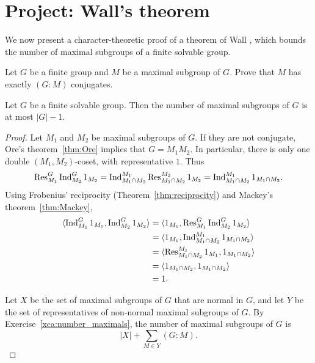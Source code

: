 \section{Project: Wall's theorem}

We now present a character-theoretic proof of a theorem of Wall \cite{MR125156}, 
which bounds the number of maximal subgroups of a finite solvable group. 

\begin{exercise}
    \label{xca:number_maximals}
    Let $G$ be a finite group and $M$ be a maximal subgroup of $G$.
    Prove that $M$ has exactly $(G:M)$ conjugates. 
\end{exercise}

\begin{theorem}[Wall]
\label{thm:Wall}
Let $G$ be a finite solvable group. Then the number of maximal subgroups of $G$ is at most $|G|-1$. 
\end{theorem}

\begin{proof}
    Let $M_1$ and $M_2$ be maximal subgroups of $G$. If they are not conjugate, 
    Ore's theorem~\ref{thm:Ore} implies that $G=M_1M_2$. In particular, 
    there is only one double $(M_1,M_2)$-coset, with representative $1$. Thus
    \[
    \operatorname{Res}_{M_1}^G\operatorname{Ind}_{M_2}^G1_{M_2}=\operatorname{Ind}_{M_1\cap M_2}^{M_1}\operatorname{Res}_{M_1\cap M_2}^{M_2}1_{M_2}
    =\operatorname{Ind}_{M_1\cap M_2}^{M_1}1_{M_1\cap M_2}.
    \]
    Using Frobenius' reciprocity (Theorem~\ref{thm:reciprocity}) and 
    Mackey's theorem~\ref{thm:Mackey}, 
    \begin{align*}
    \langle\operatorname{Ind}_{M_1}^G1_{M_1},\operatorname{Ind}_{M_2}^G1_{M_2}\rangle
    &=\langle 1_{M_1},\operatorname{Res}_{M_1}^G\operatorname{Ind}_{M_2}^G1_{M_2}\rangle\\
    &=\langle 1_{M_1},\operatorname{Ind}_{M_1\cap M_2}^{M_1}1_{M_1\cap M_2}\rangle\\
    &=\langle \operatorname{Res}_{M_1\cap M_2}^{M_1}1_{M_1},1_{M_1\cap M_2}\rangle\\
    &=\langle 1_{M_1\cap M_2},1_{M_1\cap M_2}\rangle\\
    &=1.
    \end{align*}
    
   Let $X$ be the set of maximal subgroups of $G$ that are normal in $G$, and 
   let $Y$ be the set of representatives of non-normal 
   maximal subgroups of $G$. By Exercise~\ref{xca:number_maximals}, 
   the number of 
   maximal subgroups of $G$ is 
   \[
   |X|+\sum_{M\in Y}(G:M).
   \]

   
\end{proof}


